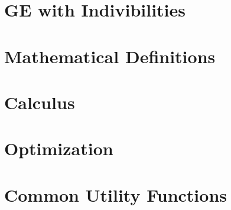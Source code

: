 \documentclass{article}
\begin{document}


\newpage

\section{GE with Indivibilities}
\label{sec:ge-with-indiv}



\newpage
\appendix
\section{Mathematical Definitions}
\label{sec:math-defin}

 

\newpage

\section{Calculus}
\label{sec:calculus}



\newpage
\section{Optimization}
\label{sec:optimization}



\newpage

\section{Common Utility Functions}
\label{sec:comm-util-funct}


\end{document}
